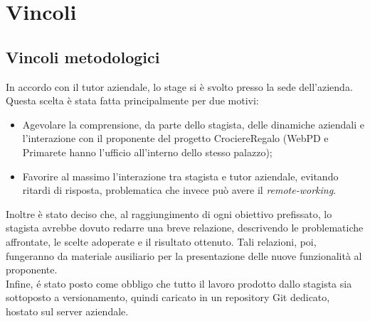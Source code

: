 \section{Vincoli}
\subsection{Vincoli metodologici}
In accordo con il tutor aziendale, lo stage si è svolto presso la sede dell'azienda. Questa scelta è stata fatta principalmente per due motivi:
\begin{itemize}
	\item Agevolare la comprensione, da parte dello stagista, delle dinamiche aziendali e l'interazione con il proponente del progetto CrociereRegalo (WebPD e Primarete hanno l'ufficio all'interno dello stesso palazzo);
	\item Favorire al massimo l'interazione tra stagista e tutor aziendale, evitando ritardi di risposta, problematica che invece può avere il \textit{remote-working}.
\end{itemize}
Inoltre è stato deciso che, al raggiungimento di ogni obiettivo prefissato, lo stagista avrebbe dovuto redarre una breve relazione, descrivendo le problematiche affrontate, le scelte adoperate e il risultato ottenuto. Tali relazioni, poi, fungeranno da materiale ausiliario per la presentazione delle nuove funzionalità al proponente.\\
Infine, é stato posto come obbligo che tutto il lavoro prodotto dallo stagista sia sottoposto a versionamento, quindi caricato in un repository Git dedicato, hostato sul server aziendale.

